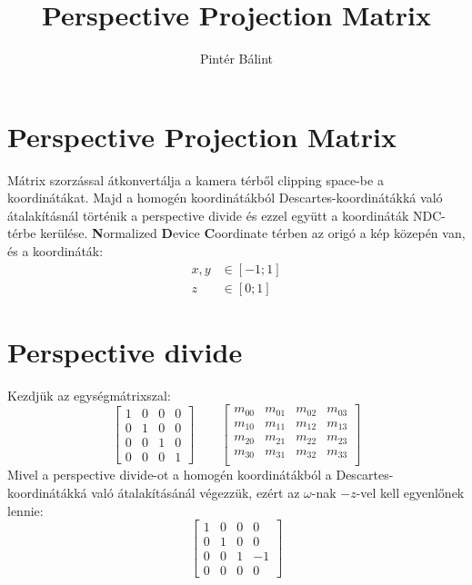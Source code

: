 \documentclass[12pt]{report}
\title{Perspective Projection Matrix}
\author{Pintér Bálint}
\begin{document}
\maketitle
\tableofcontents
\newpage

\section{Perspective Projection Matrix}
Mátrix szorzással átkonvertálja a kamera térből clipping space-be a
koordinátákat. Majd a homogén koordinátákból Descartes-koordinátákká való
átalakításnál történik a perspective divide és ezzel együtt a koordináták
NDC-térbe kerülése. \textbf{N}ormalized \textbf{D}evice \textbf{C}oordinate
térben az origó a kép közepén van, és a koordináták:
\begin{align*}
    x,y & \in[-1;1] \\
    z   & \in[0;1]
\end{align*}

\section{Perspective divide}
Kezdjük az egységmátrixszal:
\[
    \begin{bmatrix}
        1 & 0 & 0 & 0 \\
        0 & 1 & 0 & 0 \\
        0 & 0 & 1 & 0 \\
        0 & 0 & 0 & 1
    \end{bmatrix}
    \qquad
    \begin{bmatrix}
        m_{00} & m_{01} & m_{02} & m_{03} \\
        m_{10} & m_{11} & m_{12} & m_{13} \\
        m_{20} & m_{21} & m_{22} & m_{23} \\
        m_{30} & m_{31} & m_{32} & m_{33} \\
    \end{bmatrix}
\]
Mivel a perspective divide-ot a homogén koordinátákból a
Descartes-koordinátákká való átalakításánál végezzük, ezért az $\omega$-nak
$-z$-vel kell egyenlőnek lennie:
\[
    \begin{bmatrix}
        1 & 0 & 0 & 0  \\
        0 & 1 & 0 & 0  \\
        0 & 0 & 1 & -1 \\
        0 & 0 & 0 & 0
    \end{bmatrix}
\]
\end{document}
